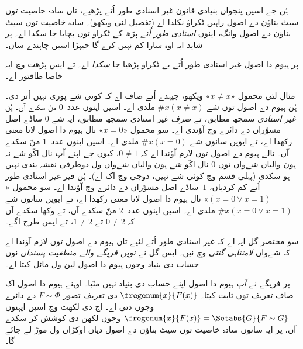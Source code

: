 \documentclass[../../../include/open-logic-section]{subfiles}
\begin{document}
ہُن جے اسیں پنجواں بنیادی قانون غیر اسنادی طور اُتے پڑھیے، تاں سادہ خاصیت توں سیٹ بناؤن دے اصول راہیں ٹکراؤ نکلدا اے (تفصیل لئی  ویکھو)۔ سادہ خاصیت توں سیٹ بناؤن دے اصول وانگ، اینوں \emph{اسنادی طور اُتے} پڑھ کے ٹکراؤ توں بچایا جا سکدا اے۔ پر شاید ایہ اوہ سارا کم نہیں کرے گا جیہڑا اسیں چاہندے ساں۔

پر ہیوم دا اصول غیر اسنادی طور اُتے بے ٹکراؤ پڑھیا جا \emph{سکدا} اے۔ تے ایس پڑھت وچ ایہ خاصا طاقتور اے۔

مثال لئی محمول «$x \neq x$» ویکھو، جیہدے اُتے صاف اے کہ کوئی شے پوری نہیں اُتر دی۔ ہُن ہیوم دے اصول توں شے $\# x( x\neq
x)$ ملدی اے۔ اسیں اینوں عدد~$0$ منّ سکدے آں۔ ہُن \emph{غیر اسنادی} سمجھ مطابق، تے \emph{صرف} غیر اسنادی سمجھ مطابق، ایہ شے $0$ ساڈے اصل مسوّراں دے دائرے وچ آؤندی اے۔ سو محمول «$x = 0$» نال ہیوم دا اصول لانا معنی رکھدا اے، تے ایویں سانوں شے $\#x (x =
0)$ ملدی اے۔ اسیں اینوں عدد~$1$ منّ سکدے آں۔ نالے ہیوم دے اصول توں لازم آؤندا اے کہ $0 \neq 1$، کیوں جے اپنے آپ نال اکّو شے نہ ہون والیاں شےواں توں $0$ نال اکّو شے ہون والیاں شےواں ول دوطرفی نقشہ بندی نہیں ہو سکدی (پہلی قسم وچ کوئی شے نہیں، دوجی وچ اک اے)۔ ہُن فیر غیر اسنادی طور اُتے کم کردیاں، $1$~ساڈے اصل مسوّراں دے دائرے وچ آؤندا اے۔ سو محمول «$(x = 0 \lor x = 1)$» نال ہیوم دا اصول لانا معنی رکھدا اے، تے ایویں سانوں شے $\#x(x = 0 \lor
x = 1)$ ملدی اے۔ اسیں اینوں عدد~$2$ منّ سکدے آں، تے وکھا سکدے آں کہ $0\neq 2$ تے $1 \neq 2$، تے ایس طرح اگے۔

سو مختصر گل ایہ اے کہ غیر اسنادی طور اُتے لئیے تاں ہیوم دے اصول توں لازم آؤندا اے کہ شےواں \emph{لامتناہی گنتی وچ} نیں۔ ایس گل نے \emph{نویں فریگے والے منطقیت پسنداں} نوں حساب دی بنیاد وجوں ہیوم دا اصول لین ول مائل کیتا اے۔

پر فریگے نے \emph{آپ} ہیوم دا اصول اپنے حساب دی بنیاد نہیں منّیا۔ اوہنے ہیوم دا اصول اک صاف تعریف توں ثابت کیتا۔ $\fregenum{x}{F(x)}$ دی تعریف تصور $F \sim \Phi$ دے دائرے وجوں دتی اے۔ اج دی لکھت وچ اسیں ایہنوں $\fregenum{x}{F(x)} = \Setabs{G}{F \sim G}$ وجوں لکھن دی کوشش کر سکدے آں، پر ایہ سانوں سادہ خاصیت توں سیٹ بناؤن دے اصول دیاں اوکڑاں ول موڑ لے جائے گا۔
\end{document}
